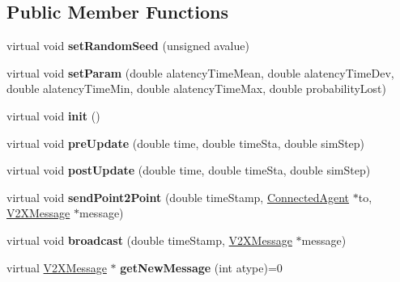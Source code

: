\subsection*{Public Member Functions}
\begin{DoxyCompactItemize}
\item 
virtual void {\bfseries set\+Random\+Seed} (unsigned avalue)\hypertarget{classV2XRandomBroker_a538176e624c98b745cbfb0a423a06430}{}\label{classV2XRandomBroker_a538176e624c98b745cbfb0a423a06430}

\item 
virtual void {\bfseries set\+Param} (double alatency\+Time\+Mean, double alatency\+Time\+Dev, double alatency\+Time\+Min, double alatency\+Time\+Max, double probability\+Lost)\hypertarget{classV2XRandomBroker_a7dfb34eef14fb965d51768147d5e2efb}{}\label{classV2XRandomBroker_a7dfb34eef14fb965d51768147d5e2efb}

\item 
virtual void {\bfseries init} ()\hypertarget{classV2XRandomBroker_ad89723bad249bede6900c8b941f6eea3}{}\label{classV2XRandomBroker_ad89723bad249bede6900c8b941f6eea3}

\item 
virtual void {\bfseries pre\+Update} (double time, double time\+Sta, double sim\+Step)\hypertarget{classV2XRandomBroker_ae4fd93d9308137ef923a2e47b1916f9f}{}\label{classV2XRandomBroker_ae4fd93d9308137ef923a2e47b1916f9f}

\item 
virtual void {\bfseries post\+Update} (double time, double time\+Sta, double sim\+Step)\hypertarget{classV2XRandomBroker_a2d543262de2092bc9535b528c92d5a31}{}\label{classV2XRandomBroker_a2d543262de2092bc9535b528c92d5a31}

\item 
virtual void {\bfseries send\+Point2\+Point} (double time\+Stamp, \hyperlink{classConnectedAgent}{Connected\+Agent} $\ast$to, \hyperlink{classV2XMessage}{V2\+X\+Message} $\ast$message)\hypertarget{classV2XRandomBroker_ad53bb0e8b65f085ee9c2fdc2e5828156}{}\label{classV2XRandomBroker_ad53bb0e8b65f085ee9c2fdc2e5828156}

\item 
virtual void {\bfseries broadcast} (double time\+Stamp, \hyperlink{classV2XMessage}{V2\+X\+Message} $\ast$message)\hypertarget{classV2XRandomBroker_a57f4e8bbf26806335875adf9c20189be}{}\label{classV2XRandomBroker_a57f4e8bbf26806335875adf9c20189be}

\item 
virtual \hyperlink{classV2XMessage}{V2\+X\+Message} $\ast$ {\bfseries get\+New\+Message} (int atype)=0\hypertarget{classV2XRandomBroker_a2e216df9b1d84479e84c0ce72a2dfbd7}{}\label{classV2XRandomBroker_a2e216df9b1d84479e84c0ce72a2dfbd7}

\end{DoxyCompactItemize}
